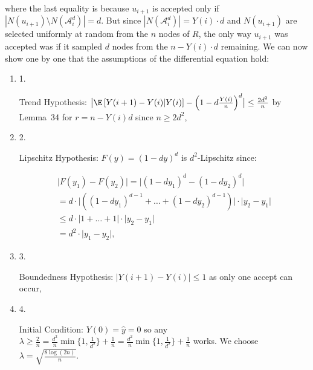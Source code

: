 \documentclass[10pt,a4paper]{article}
\begin{document}
where the last equality is because $u_{i+1}$ is accepted only if $|N(u_{i+1})\setminus N(\mathcal{A}^{d}_{i})|=d$. But since $|N(\mathcal{A}^{d}_{i})|=Y(i)\cdot d$ and $N(u_{i+1})$ are selected uniformly at random from the $n$ nodes of $R$, the only way $u_{i+1}$ was accepted was if it sampled $d$ nodes from the $n-Y(i)\cdot d$ remaining.
We can now show one by one that the assumptions of the differential equation hold:\par


\begin{enumerate}


\item[] 1. 


Trend Hypothesis: $\bigl|\E\left[Y(i+1)-Y(i)\middle|Y(i)\right]-\left(1-d\frac{Y(i)}{n}\right)^{d}\bigr|\leq\frac{2d^{2}}{n}$ by Lemma 34 for $r=n-Y(i)d$ since $n\geq 2d^{2}$,\par




\item[] 2. 


Lipschitz Hypothesis: $F(y)=\left(1-dy\right)^{d}$ is $d^{2}$-Lipschitz since:\par


\[\begin{gathered}
\displaystyle\bigl|F(y_{1})-F(y_{2})\bigr| \displaystyle=\bigl|\left(1-dy_{1}\right)^{d}-\left(1-dy_{2}\right)^{d}\bigr| \\
\displaystyle=d\cdot\bigl|\left(\left(1-dy_{1}\right)^{d-1}+\dots+\left(1-dy_{2}\right)^{d-1}\right)\bigr|\cdot\bigl|y_{2}-y_{1}\bigr| \\
\displaystyle\leq d\cdot\bigl|1+\dots+1\bigr|\cdot\bigl|y_{2}-y_{1}\bigr| \\
\displaystyle=d^{2}\cdot\bigl|y_{1}-y_{2}\bigr|,
\end{gathered}\]




\item[] 3. 


Boundedness Hypothesis: $\bigl|Y(i+1)-Y(i)\bigr|\leq 1$ as only one accept can occur,\par




\item[] 4. 


Initial Condition: $Y(0)=\hat{y}=0$ so any $\lambda\geq\frac{2}{n}=\frac{d^{2}}{n}\min\{1,\frac{1}{d^{2}}\}+\frac{1}{n}=\frac{d^{2}}{n}\min\{1,\frac{1}{d^{2}}\}+\frac{1}{n}$ works. We choose $\lambda=\sqrt{\frac{8\log{(2n)}}{n}}$.\par




\end{enumerate}
\end{document}
